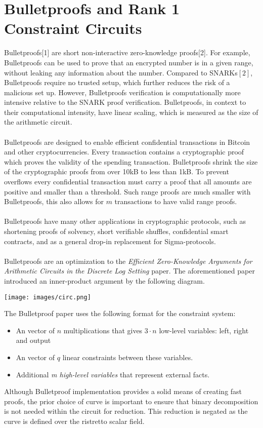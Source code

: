 \documentclass{article}
\begin{document}
\section{Bulletproofs and Rank 1 Constraint Circuits} 
Bulletproofs[1] are short non-interactive zero-knowledge proofs[2]. For example, Bulletproofs can be used to prove that an encrypted number is in a given range, without leaking any information about the number. Compared to SNARKs$[2]$, Bulletproofs require no trusted setup, which further reduces the risk of a malicious set up. However, Bulletproofs verification is computationally more intensive relative to the SNARK proof verification. Bulletproofs, in context to their computational intensity, have linear scaling, which is measured as the size of the arithmetic circuit.\\\\
Bulletproofs are designed to enable efficient confidential transactions in Bitcoin and other cryptocurrencies. Every transaction contains a cryptographic proof which proves the validity of the spending transaction. Bulletproofs shrink the size of the cryptographic proofs from over 10kB to less than 1kB. To prevent overflows every confidential transaction must carry a proof that all amounts are positive and smaller than a threshold. Such range proofs are much smaller with Bulletproofs, this also allows for $m$ transactions to have valid range proofs. \\\\
Bulletproofs have many other applications in cryptographic protocols, such as shortening proofs of solvency, short verifiable shuffles, confidential smart contracts, and as a general drop-in replacement for Sigma-protocols. \\\\
Bulletproofs are an optimization to the \emph{Efficient Zero-Knowledge Arguments for
Arithmetic Circuits in the Discrete Log Setting} paper. The aforementioned paper introduced an inner-product argument by the following diagram.
\begin{center}
\texttt{[image: images/circ.png]}
\end{center}
The Bulletproof paper uses the following format for the constraint system: 
\begin{itemize}
    \item  An vector of $n$ multiplications that gives $3 \cdot n$ low-level variables: left, right and output
    \item An vector of $q$ linear constraints between these variables.
    \item Additional \emph{m high-level variables} that represent external facts.
\end{itemize} 
 Although Bulletproof implementation provides a solid means of creating fast proofs, the prior choice of curve is important to ensure that binary decomposition is not needed within the circuit for reduction. This reduction is negated as the curve is defined over the ristretto scalar field.  
\end{document}
